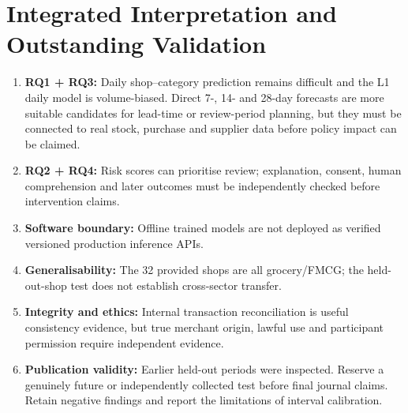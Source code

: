 \section{Integrated Interpretation and Outstanding Validation}
\begin{enumerate}
\item \textbf{RQ1 + RQ3:} Daily shop--category prediction remains difficult and the L1 daily model is volume-biased. Direct 7-, 14- and 28-day forecasts are more suitable candidates for lead-time or review-period planning, but they must be connected to real stock, purchase and supplier data before policy impact can be claimed.
\item \textbf{RQ2 + RQ4:} Risk scores can prioritise review; explanation, consent, human comprehension and later outcomes must be independently checked before intervention claims.
\item \textbf{Software boundary:} Offline trained models are not deployed as verified versioned production inference APIs.
\item \textbf{Generalisability:} The 32 provided shops are all grocery/FMCG; the held-out-shop test does not establish cross-sector transfer.
\item \textbf{Integrity and ethics:} Internal transaction reconciliation is useful consistency evidence, but true merchant origin, lawful use and participant permission require independent evidence.
\item \textbf{Publication validity:} Earlier held-out periods were inspected. Reserve a genuinely future or independently collected test before final journal claims. Retain negative findings and report the limitations of interval calibration.
\end{enumerate}
